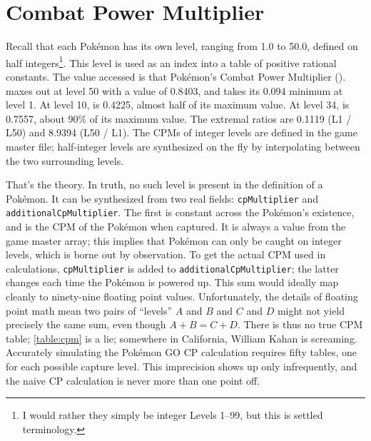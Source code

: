 \section{Combat Power Multiplier\label{sec:cpm}}
Recall that each Pokémon has its own level, ranging from 1.0
 to 50.0, defined on half integers\footnote{I would rather they
 simply be integer Levels 1--99, but this is settled terminology.}.
This level is used as an index into a table of positive rational constants.
The value accessed is that Pokémon's Combat Power Multiplier (\CPM).
\CPM{} maxes out at level 50 with a value of 0.8403, and takes its 0.094 minimum at level 1.
At level 10, \CPM{} is 0.4225, almost half of its maximum value.
At level 34, \CPM{} is 0.7557, about 90\% of its maximum value.
The extremal ratios are 0.1119 (L1 / L50) and 8.9394 (L50 / L1).
The CPMs of integer levels are defined in the game master file; half-integer levels
 are synthesized on the fly by interpolating between the two surrounding levels.

That's the theory.
In truth, no such level is present in the definition of a Pokémon.
It can be synthesized from two real fields: \texttt{cpMultiplier} and \texttt{additionalCpMultiplier}.
The first is constant across the Pokémon's existence, and is the CPM of the Pokémon when captured.
It is always a value from the game master array; this implies that Pokémon can only be caught on integer levels,
 which is borne out by observation.
To get the actual CPM used in calculations, \texttt{cpMultiplier} is added to \texttt{additionalCpMultiplier}; the
 latter changes each time the Pokémon is powered up.
This sum would ideally map cleanly to ninety-nine floating point values.
Unfortunately, the details of floating point math mean two pairs of ``levels'' $A$ and $B$
 and $C$ and $D$ might not yield precisely the same sum, even though $A+B = C+D$.
There is thus no true CPM table; \autoref{table:cpm} is a lie; somewhere in
 California, William Kahan is screaming.
Accurately simulating the Pokémon GO CP calculation requires fifty tables, one for each possible capture level.
This imprecision shows up only infrequently, and the naive CP calculation is never more than one point off.

